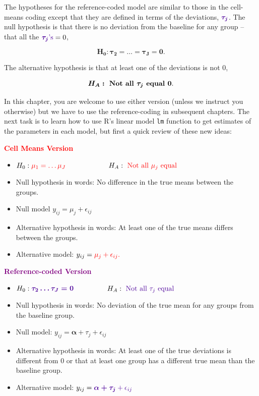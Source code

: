 \documentclass[]{book}
\begin{document}
The hypotheses for the reference-coded model are similar to those in the
cell-means coding except that they are defined in terms of the
deviations, \({\color{purple}{\boldsymbol{\tau_j}}}\). The null
hypothesis is that there is no deviation from the baseline for any group
-- that all the \({\color{purple}{\boldsymbol{\tau_j\text{'s}}}}=0\),

\[\boldsymbol{H_0: \tau_2=\ldots=\tau_J=0}.\]

The alternative hypothesis is that at least one of the deviations is not
0,

\[\boldsymbol{H_A:} \textbf{ Not all } \boldsymbol{\tau_j} \textbf{ equal } \bf{0}.\]

In this chapter, you are welcome to use either version (unless we
instruct you otherwise) but we have to use the reference-coding in
subsequent chapters. The next task is to learn how to use R's linear
model \texttt{lm} function to get estimates of the parameters in each
model, but first a quick review of these new ideas:

\textcolor{red}{\textbf{Cell Means Version}}

\begin{itemize}
\item
  \(H_0: {\color{red}{\mu_1=\ldots\mu_J}}\) ~~~~~~~ ~~~
  \(H_A: {\color{red}{\text{ Not all } \mu_j \text{ equal}}}\)
\item
  Null hypothesis in words: No difference in the true means between the
  groups.
\item
  Null model \(y_{ij} = \mu_j+\epsilon_{ij}\)
\item
  Alternative hypothesis in words: At least one of the true means
  differs between the groups.
\item
  Alternative model: \(y_{ij} = \color{red}{\mu_j}+\epsilon_{ij}.\)
\end{itemize}

\textcolor{purple}{\textbf{Reference-coded Version}}

\begin{itemize}
\item
  \(H_0: \color{purple}{\boldsymbol{\tau_2 \ldots \tau_J = 0}}\)
  ~~~~~~~~
  \(H_A: \color{purple}{\text{ Not all } \tau_j \text{ equal}}\)
\item
  Null hypothesis in words: No deviation of the true mean for any groups
  from the baseline group.
\item
  Null model: \(y_{ij} =\boldsymbol{\alpha} + \tau_j+\epsilon_{ij}\)
\item
  Alternative hypothesis in words: At least one of the true deviations
  is different from 0 or that at least one group has a different true
  mean than the baseline group.
\item
  Alternative model:
  \(y_{ij} =\color{purple}{\boldsymbol{\alpha + \tau_j}}+\epsilon_{ij}\)
\end{itemize}
\end{document}
